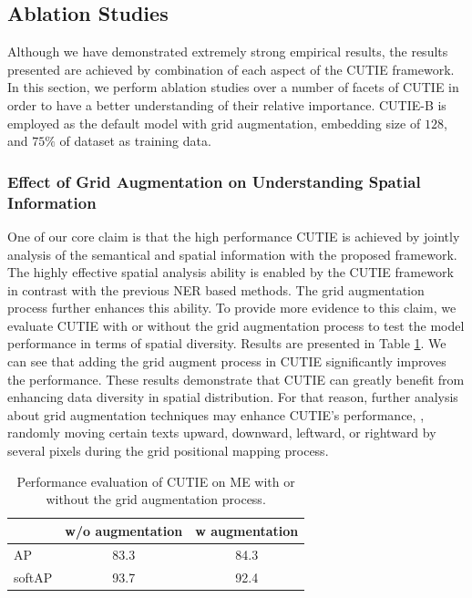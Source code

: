 \documentclass[10pt,twocolumn,letterpaper]{article}
\begin{document}
\subsection{Ablation Studies}
Although we have demonstrated extremely strong empirical results, the results presented are achieved by combination of each aspect of the CUTIE framework. In this section, we perform ablation studies over a number of facets of CUTIE in order to have a better understanding of their relative importance. CUTIE-B is employed as the default model with grid augmentation, embedding size of $128$, and $75\%$ of dataset as training data.

\subsubsection{Effect of Grid Augmentation on Understanding Spatial Information}
One of our core claim is that the high performance CUTIE is achieved by jointly analysis of the semantical and spatial information with the proposed framework. The highly effective spatial analysis ability is enabled by the CUTIE framework in contrast with the previous NER based methods. The grid augmentation process further enhances this ability. To provide more evidence to this claim, we evaluate CUTIE with or without the grid augmentation process to test the model performance in terms of spatial diversity. Results are presented in Table \ref{tab:augmentation}. We can see that adding the grid augment process in CUTIE significantly improves the performance. These results demonstrate that CUTIE can greatly benefit from enhancing data diversity in spatial distribution. For that reason, further analysis about grid augmentation techniques may enhance CUTIE's performance, \eg, randomly moving certain texts upward, downward, leftward, or rightward by several pixels during the grid positional mapping process. 
\begin{table}
	\caption{Performance evaluation of CUTIE on ME with or without the grid augmentation process.}
\begin{center}
\begin{tabular}{l | c | c}
	 & w/o augmentation & w augmentation \\
	\hline
	AP & 83.3 & 84.3 \\
	softAP & 93.7 & 92.4 \\
\end{tabular}
\end{center}
	\label{tab:augmentation}
\end{table}
\end{document}
